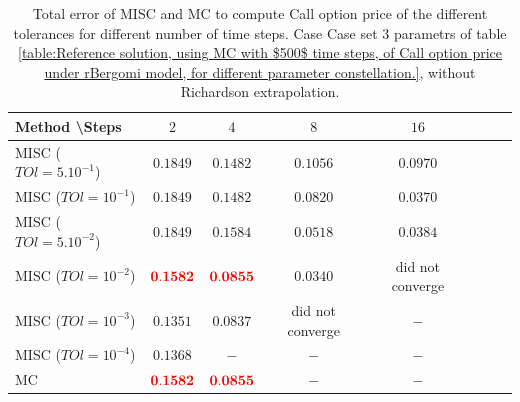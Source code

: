 \documentclass[11pt]{article}
\begin{document}
\begin{table}[h!]
	\centering
	\begin{tabular}{l*{6}{c}r}
		Method \textbackslash  Steps            & $2$ & $4$ & $8$ & $16$  \\
		\hline
		MISC ($TOl=5.10^{-1}$)  & $\mathbf{0.1849}$ & $\mathbf{0.1482}$ & $\mathbf{ 0.1056}$ & $\mathbf{ 0.0970}$  \\
		MISC ($TOl=10^{-1}$)  & $\mathbf{0.1849}$ & $\mathbf{0.1482}$ & $\mathbf{ 0.0820}$ & $\mathbf{0.0370}$  \\
		MISC ($TOl=5.10^{-2}$)  &$\mathbf{0.1849}$ & $\mathbf{0.1584}$ & $\mathbf{0.0518}$ & $\mathbf{0.0384}$  \\
		MISC ($TOl=10^{-2}$)  & $\mathbf{{\color{red}0.1582}}$ & $\mathbf{{\color{red}0.0855}}$ & $\mathbf{0.0340}$ & did not converge  \\
		MISC ($TOl=10^{-3}$)  & $\mathbf{0.1351}$ & $\mathbf{0.0837}$ & did not converge & $\mathbf{-}$  \\
		MISC ($TOl=10^{-4}$)  & $\mathbf{0.1368}$ & $\mathbf{-}$ & $\mathbf{-}$ & $\mathbf{-}$  \\
		\hline
			MC    &  $\mathbf{{\color{red}0.1582}}$   &$\mathbf{{\color{red}0.0855}}$ & $\mathbf{-}$ & $\mathbf{-}$  \\
			
		\hline
	\end{tabular}
	\caption{Total error of MISC and MC to compute Call option price of the different tolerances for different number of time steps. Case Case set $3$ parametrs of table \ref{table:Reference solution, using MC with $500$ time steps, of Call option price under rBergomi model, for different parameter constellation.}, without Richardson extrapolation.}
	\label{Total error of MISC and MC to compute Call option price of the different tolerances for different number of time steps. Case set 3, without Richardson extrapolation. The numbers between parentheses are the corresponding absolute errors.}
\end{table}
\end{document}
